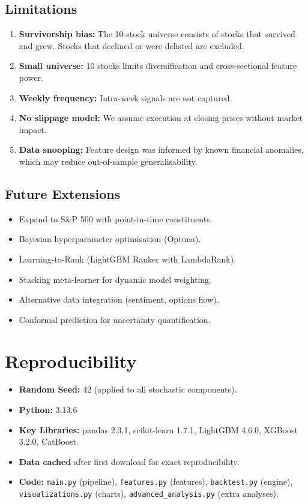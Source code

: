 \documentclass[12pt,a4paper]{article}
\begin{document}
\subsection{Limitations}
\begin{enumerate}
    \item \textbf{Survivorship bias:} The 10-stock universe consists of stocks that survived and grew. Stocks that declined or were delisted are excluded.
    \item \textbf{Small universe:} 10 stocks limits diversification and cross-sectional feature power.
    \item \textbf{Weekly frequency:} Intra-week signals are not captured.
    \item \textbf{No slippage model:} We assume execution at closing prices without market impact.
    \item \textbf{Data snooping:} Feature design was informed by known financial anomalies, which may reduce out-of-sample generalisability.
\end{enumerate}

\subsection{Future Extensions}
\begin{itemize}
    \item Expand to S\&P 500 with point-in-time constituents.
    \item Bayesian hyperparameter optimisation (Optuna).
    \item Learning-to-Rank (LightGBM Ranker with LambdaRank).
    \item Stacking meta-learner for dynamic model weighting.
    \item Alternative data integration (sentiment, options flow).
    \item Conformal prediction for uncertainty quantification.
\end{itemize}

\section{Reproducibility}

\begin{itemize}
    \item \textbf{Random Seed:} 42 (applied to all stochastic components).
    \item \textbf{Python:} 3.13.6
    \item \textbf{Key Libraries:} pandas 2.3.1, scikit-learn 1.7.1, LightGBM 4.6.0, XGBoost 3.2.0, CatBoost.
    \item \textbf{Data cached} after first download for exact reproducibility.
    \item \textbf{Code:} \texttt{main.py} (pipeline), \texttt{features.py} (features), \texttt{backtest.py} (engine), \texttt{visualizations.py} (charts), \texttt{advanced\_analysis.py} (extra analyses).
\end{itemize}
\end{document}
